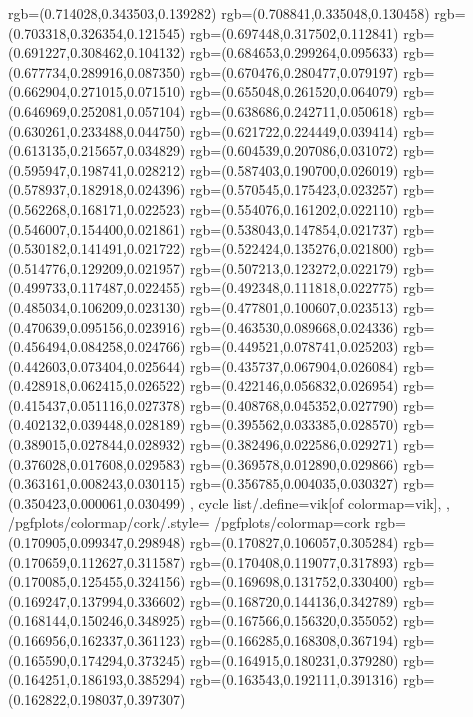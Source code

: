 {{{			rgb=(0.714028,0.343503,0.139282)
			rgb=(0.708841,0.335048,0.130458)
			rgb=(0.703318,0.326354,0.121545)
			rgb=(0.697448,0.317502,0.112841)
			rgb=(0.691227,0.308462,0.104132)
			rgb=(0.684653,0.299264,0.095633)
			rgb=(0.677734,0.289916,0.087350)
			rgb=(0.670476,0.280477,0.079197)
			rgb=(0.662904,0.271015,0.071510)
			rgb=(0.655048,0.261520,0.064079)
			rgb=(0.646969,0.252081,0.057104)
			rgb=(0.638686,0.242711,0.050618)
			rgb=(0.630261,0.233488,0.044750)
			rgb=(0.621722,0.224449,0.039414)
			rgb=(0.613135,0.215657,0.034829)
			rgb=(0.604539,0.207086,0.031072)
			rgb=(0.595947,0.198741,0.028212)
			rgb=(0.587403,0.190700,0.026019)
			rgb=(0.578937,0.182918,0.024396)
			rgb=(0.570545,0.175423,0.023257)
			rgb=(0.562268,0.168171,0.022523)
			rgb=(0.554076,0.161202,0.022110)
			rgb=(0.546007,0.154400,0.021861)
			rgb=(0.538043,0.147854,0.021737)
			rgb=(0.530182,0.141491,0.021722)
			rgb=(0.522424,0.135276,0.021800)
			rgb=(0.514776,0.129209,0.021957)
			rgb=(0.507213,0.123272,0.022179)
			rgb=(0.499733,0.117487,0.022455)
			rgb=(0.492348,0.111818,0.022775)
			rgb=(0.485034,0.106209,0.023130)
			rgb=(0.477801,0.100607,0.023513)
			rgb=(0.470639,0.095156,0.023916)
			rgb=(0.463530,0.089668,0.024336)
			rgb=(0.456494,0.084258,0.024766)
			rgb=(0.449521,0.078741,0.025203)
			rgb=(0.442603,0.073404,0.025644)
			rgb=(0.435737,0.067904,0.026084)
			rgb=(0.428918,0.062415,0.026522)
			rgb=(0.422146,0.056832,0.026954)
			rgb=(0.415437,0.051116,0.027378)
			rgb=(0.408768,0.045352,0.027790)
			rgb=(0.402132,0.039448,0.028189)
			rgb=(0.395562,0.033385,0.028570)
			rgb=(0.389015,0.027844,0.028932)
			rgb=(0.382496,0.022586,0.029271)
			rgb=(0.376028,0.017608,0.029583)
			rgb=(0.369578,0.012890,0.029866)
			rgb=(0.363161,0.008243,0.030115)
			rgb=(0.356785,0.004035,0.030327)
			rgb=(0.350423,0.000061,0.030499)
		},
	cycle list/.define={vik}{[of colormap=vik]},
	},
	/pgfplots/colormap/cork/.style={
		/pgfplots/colormap={cork}{%
			rgb=(0.170905,0.099347,0.298948)
			rgb=(0.170827,0.106057,0.305284)
			rgb=(0.170659,0.112627,0.311587)
			rgb=(0.170408,0.119077,0.317893)
			rgb=(0.170085,0.125455,0.324156)
			rgb=(0.169698,0.131752,0.330400)
			rgb=(0.169247,0.137994,0.336602)
			rgb=(0.168720,0.144136,0.342789)
			rgb=(0.168144,0.150246,0.348925)
			rgb=(0.167566,0.156320,0.355052)
			rgb=(0.166956,0.162337,0.361123)
			rgb=(0.166285,0.168308,0.367194)
			rgb=(0.165590,0.174294,0.373245)
			rgb=(0.164915,0.180231,0.379280)
			rgb=(0.164251,0.186193,0.385294)
			rgb=(0.163543,0.192111,0.391316)
			rgb=(0.162822,0.198037,0.397307)
}}}
